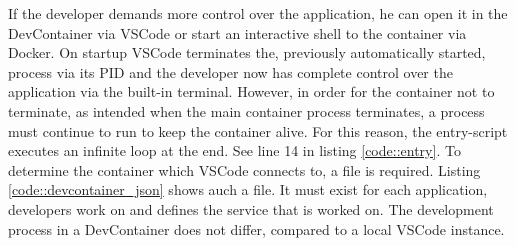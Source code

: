         If the developer demands more control over the application, he can open it in the DevContainer via \ac{VSCode} or start an interactive shell to the container via Docker. On startup \ac{VSCode} terminates the, previously automatically started, process via its \ac{PID} and the developer now has complete control over the application via the built-in terminal. However, in order for the container not to terminate, as intended when the main container process terminates, a process must continue to run to keep the container alive. For this reason, the entry-script executes an infinite loop at the end. See line 14 in listing \ref{code::entry}. To determine the container which \ac{VSCode} connects to, a  file is required. Listing \ref{code::devcontainer_json} shows auch a  file. It must exist for each application, developers work on and defines the service that is worked on. The development process in a DevContainer does not differ, compared to a local \ac{VSCode} instance.


